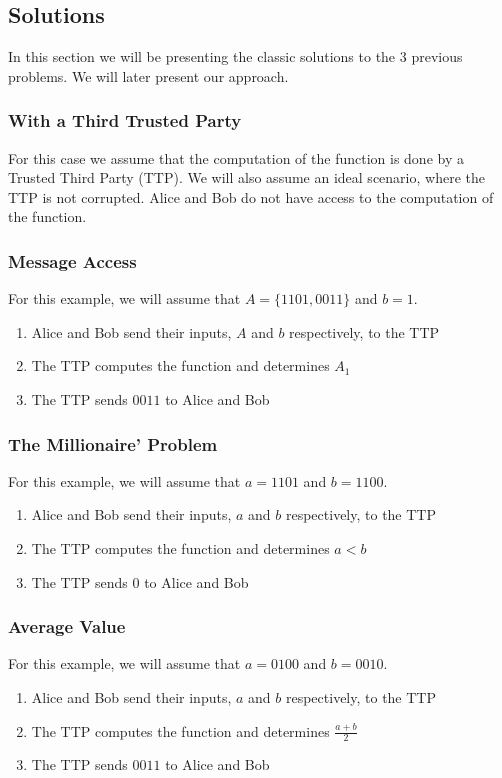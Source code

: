 \begin{refsection}
\subsection{Solutions}
In this section we will be presenting the classic solutions to the 3 previous problems. We will later present our approach.
\subsubsection{With a Third Trusted Party}
For this case we assume that the computation of the function is done by a Trusted Third Party (TTP).
We will also assume an ideal scenario, where the TTP is not corrupted.
Alice and Bob do not have access to the computation of the function.

\subsubsection{Message Access}
For this example, we will assume that $A = \{1101,0011\}$ and $b = 1$.
\begin{enumerate}
\item Alice and Bob send their inputs, $A$ and $b$ respectively, to the TTP
\item The TTP computes the function and determines $A_1$
\item The TTP sends $0011$ to Alice and Bob
\end{enumerate}

\subsubsection{The Millionaire' Problem}
For this example, we will assume that $a = 1101$ and $b = 1100$.
\begin{enumerate}
\item Alice and Bob send their inputs, $a$ and $b$ respectively, to the TTP
\item The TTP computes the function and determines $a < b$
\item The TTP sends $0$ to Alice and Bob
\end{enumerate}

\subsubsection{Average Value}
For this example, we will assume that $a = 0100$ and $b = 0010$.
\begin{enumerate}
\item Alice and Bob send their inputs, $a$ and $b$ respectively, to the TTP
\item The TTP computes the function and determines $\frac{a+b}{2}$
\item The TTP sends $0011$ to Alice and Bob
\end{enumerate}


\end{refsection}
